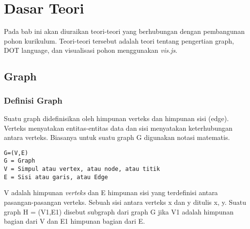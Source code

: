 \chapter{Dasar Teori}
\label{chap:Dasar Teori}
Pada bab ini akan diuraikan teori-teori yang berhubungan dengan pembangunan pohon kurikulum. Teori-teori tersebut adalah teori tentang pengertian graph, DOT language, dan visualisasi pohon menggunakan \textit{vis.js}.

\section{Graph}
\label{sec: Graph}

\subsection{Definisi Graph}
\label{sec: Definisi Graph}
Suatu graph didefinisikan oleh himpunan verteks dan himpunan sisi (edge).
Verteks menyatakan entitas-entitas data dan sisi menyatakan keterhubungan antara
verteks. Biasanya untuk suatu graph G digunakan notasi matematis. 
\begin{lstlisting}
G=(V,E)
G = Graph
V = Simpul atau vertex, atau node, atau titik
E = Sisi atau garis, atau Edge
\end{lstlisting}

V adalah himpunan \textit{verteks} dan E himpunan sisi yang terdefinisi antara pasangan-pasangan verteks. Sebuah sisi antara verteks x dan y ditulis {x, y}. Suatu graph H = (V1,E1) disebut subgraph dari graph G jika V1 adalah himpunan bagian dari V dan E1 himpunan bagian dari E.
